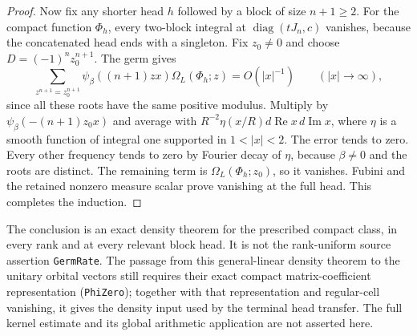 \begin{proof}
Now fix any shorter head $h$ followed by a block of size $n+1\ge2$.
For the compact function $\Phi_h$, every two-block integral at
$\operatorname{diag}(tJ_n,c)$ vanishes, because the concatenated
head ends with a singleton.  Fix $z_0\ne0$ and choose
$D=(-1)^n z_0^{n+1}$.  The germ gives
\[
 \sum_{z^{n+1}=z_0^{n+1}}
           \psi_\beta((n+1)z x)\Omega_L(\Phi_h;z)
                         =O(|x|^{-1})\qquad(|x|\to\infty),
\]
since all these roots have the same positive modulus.
Multiply by $\psi_\beta(-(n+1)z_0x)$ and average with
$R^{-2}\eta(x/R)d\operatorname{Re}x\,d\operatorname{Im}x$,
where $\eta$ is a smooth function of integral one supported in
$1<|x|<2$.  The error tends to zero.  Every other frequency tends
to zero by Fourier decay of $\eta$, because $\beta\ne0$ and the
roots are distinct.  The remaining term is
$\Omega_L(\Phi_h;z_0)$, so it vanishes.  Fubini and the retained
nonzero measure scalar prove vanishing at the full head.
This completes the induction.
\end{proof}

The conclusion is an exact density theorem for the prescribed
compact class, in every rank and at every relevant block head.
It is not the rank-uniform source assertion \texttt{GermRate}.
The passage from this general-linear density theorem to the
unitary orbital vectors still requires their exact compact
matrix-coefficient representation (\texttt{PhiZero}); together
with that representation and regular-cell vanishing, it gives
the density input used by the terminal head transfer.
The full kernel estimate and its global arithmetic application
are not asserted here.\cite{terminal-density-source}
